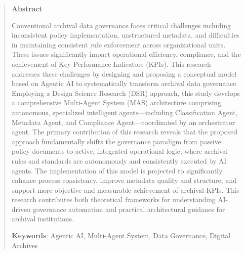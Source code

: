 \documentclass[12pt,a4paper]{article}
\begin{document}
\begin{abstract}
\normalsize
\centering
\textbf{Abstract}

Conventional archival data governance faces critical challenges including inconsistent policy implementation, unstructured metadata, and difficulties in maintaining consistent rule enforcement across organizational units. These issues significantly impact operational efficiency, compliance, and the achievement of Key Performance Indicators (KPIs). This research addresses these challenges by designing and proposing a conceptual model based on Agentic AI to systematically transform archival data governance. Employing a Design Science Research (DSR) approach, this study develops a comprehensive Multi-Agent System (MAS) architecture comprising autonomous, specialized intelligent agents---including Classification Agent, Metadata Agent, and Compliance Agent---coordinated by an orchestrator agent. The primary contribution of this research reveals that the proposed approach fundamentally shifts the governance paradigm from passive policy documents to active, integrated operational logic, where archival rules and standards are autonomously and consistently executed by AI agents. The implementation of this model is projected to significantly enhance process consistency, improve metadata quality and structure, and support more objective and measurable achievement of archival KPIs. This research contributes both theoretical frameworks for understanding AI-driven governance automation and practical architectural guidance for archival institutions.

\textbf{Keywords}: Agentic AI, Multi-Agent System, Data Governance, Digital Archives
\end{abstract}
\end{document}
